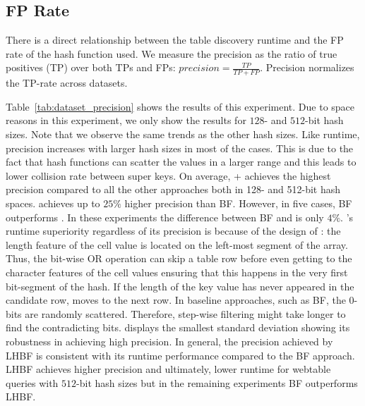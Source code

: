 \subsection{FP Rate}\label{subsubsection:fp}
There is a direct relationship between the table discovery runtime and the FP rate of the hash function used.
We measure the precision as the ratio of true positives (TP) over both TPs and FPs: $precision = \frac{TP}{TP + FP}$. Precision normalizes the TP-rate across datasets.

Table~\ref{tab:dataset_precision} shows the results of this experiment. Due to space reasons in this experiment, we only show the results for $128$- and $512$-bit hash sizes. Note that we observe the same trends as the other hash sizes.
Like runtime, precision increases with larger hash sizes in most of the cases. This is due to the fact that hash functions can scatter the values in a larger range and this leads to lower collision rate between super keys.
On average, \system + \hash achieves the highest precision compared to all the other approaches both in 128- and 512-bit hash spaces. \hash achieves up to $25\%$ higher precision than BF. 
However, in five cases, BF outperforms \hash. In these experiments the difference between BF and \hash is only $4\%$.
\system's runtime superiority regardless of its precision is because of the design of \hash: the length feature of the cell value is located on the left-most segment of the array. Thus, the bit-wise OR operation can skip a table row before even getting to the character features of the cell values ensuring that this happens in the very first bit-segment of the hash. If the length of the key value has never appeared in the candidate row, \system moves to the next row.
In baseline approaches, such as BF, the 0-bits are randomly scattered. Therefore, step-wise filtering might take longer to find the contradicting bits.
\hash displays the smallest standard deviation showing its robustness in achieving high precision.
In general, the precision achieved by LHBF is consistent with its runtime performance compared to the BF approach. LHBF achieves higher precision and ultimately, lower runtime for webtable queries with $512$-bit hash sizes but in the remaining experiments BF outperforms LHBF.
